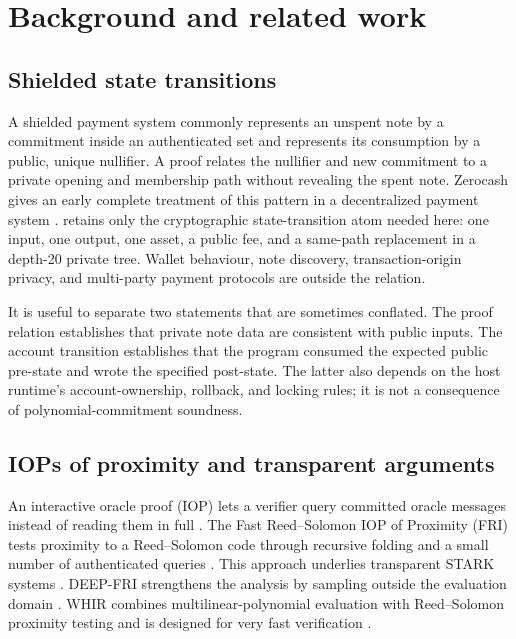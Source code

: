 \section{Background and related work}\label{sec:background}

\subsection{Shielded state transitions}

A shielded payment system commonly represents an unspent note by a commitment
inside an authenticated set and represents its consumption by a public,
unique nullifier.  A proof relates the nullifier and new commitment to a
private opening and membership path without revealing the spent note.
Zerocash gives an early complete treatment of this pattern in a decentralized
payment system \cite{BenSassonEtAl2014Zerocash}.  \Profile{} retains only the
cryptographic state-transition atom needed here: one input, one output, one
asset, a public fee, and a same-path replacement in a depth-20 private tree.
Wallet behaviour, note discovery, transaction-origin privacy, and multi-party
payment protocols are outside the relation.

It is useful to separate two statements that are sometimes conflated.  The
proof relation establishes that private note data are consistent with public
inputs.  The account transition establishes that the program consumed the
expected public pre-state and wrote the specified post-state.  The latter also
depends on the host runtime's account-ownership, rollback, and locking rules;
it is not a consequence of polynomial-commitment soundness.

\subsection{IOPs of proximity and transparent arguments}

An interactive oracle proof (IOP) lets a verifier query committed oracle
messages instead of reading them in full
\cite{BenSassonChiesaSpooner2016}.  The Fast Reed--Solomon IOP of Proximity
(FRI) tests
proximity to a Reed--Solomon code through recursive folding and a small number
of authenticated queries
\cite{BenSassonBentovHoreshRiabzev2018FRI}.  This approach underlies
transparent STARK systems
\cite{BenSassonBentovHoreshRiabzev2018STARK}.  DEEP-FRI strengthens the
analysis by sampling outside the evaluation domain
\cite{BenSassonGoldbergKoppartySaraf2020}.  WHIR combines multilinear-polynomial evaluation
with Reed--Solomon proximity testing and is designed for very fast
verification \cite{ArnonChiesaFenziYogev2025WHIR}.

